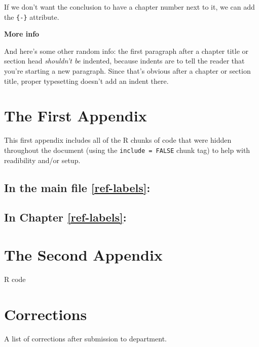 \documentclass[12pt, twoside]{amherstthesis}
\begin{document}
If we don't want the conclusion to have a chapter number next to it, we can add the \texttt{\{-\}} attribute.

\textbf{More info}

And here's some other random info: the first paragraph after a chapter title or section head \emph{shouldn't be} indented, because indents are to tell the reader that you're starting a new paragraph. Since that's obvious after a chapter or section title, proper typesetting doesn't add an indent there.

\appendix

\hypertarget{the-first-appendix}{%
\chapter{The First Appendix}\label{the-first-appendix}}

This first appendix includes all of the R chunks of code that were hidden throughout the document (using the \texttt{include\ =\ FALSE} chunk tag) to help with readibility and/or setup.

\hypertarget{in-the-main-file-refref-labels}{%
\section{In the main file \ref{ref-labels}:}\label{in-the-main-file-refref-labels}}

\hypertarget{in-chapter-refref-labels}{%
\section{In Chapter \ref{ref-labels}:}\label{in-chapter-refref-labels}}

\hypertarget{the-second-appendix}{%
\chapter{The Second Appendix}\label{the-second-appendix}}

R code

\hypertarget{corrections}{%
\chapter*{Corrections}\label{corrections}}

A list of corrections after submission to department.
\end{document}
